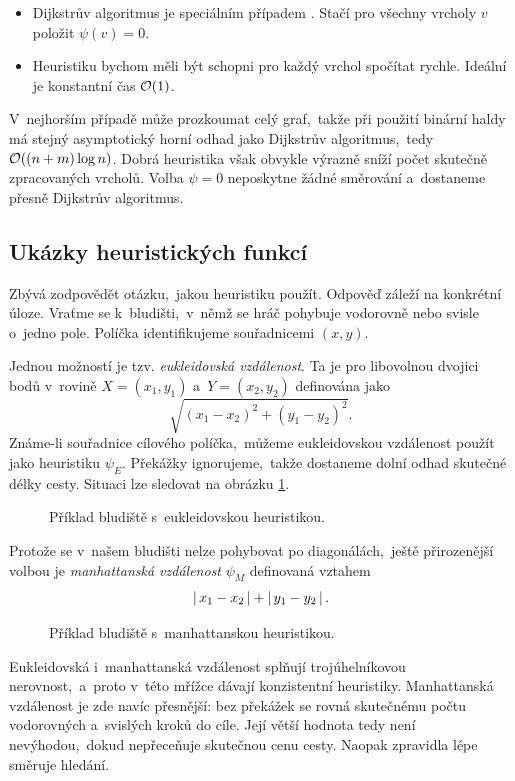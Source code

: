 
\begin{remark}
    \begin{itemize}
        \item Dijkstrův algoritmus je speciálním případem \Astar. Stačí pro všechny vrcholy $v$ položit $\psi(v)=0$.
        \item Heuristiku bychom měli být schopni pro každý vrchol spočítat rychle. Ideální je konstantní čas $\mathcal{O}(1)$.
    \end{itemize}
\end{remark}

V~nejhorším případě může \Astar{} prozkoumat celý graf,~takže při použití binární haldy má stejný asymptotický horní odhad jako Dijkstrův algoritmus,~tedy $\mathcal{O}((n+m)\log n)$. Dobrá heuristika však obvykle výrazně sníží počet skutečně zpracovaných vrcholů. Volba $\psi=0$ neposkytne žádné směrování a~dostaneme přesně Dijkstrův algoritmus.

\subsection{Ukázky heuristických funkcí}

Zbývá zodpovědět otázku,~jakou heuristiku použít. Odpověď záleží na konkrétní úloze. Vraťme se k~bludišti,~v~němž se hráč pohybuje vodorovně nebo svisle o~jedno pole. Políčka identifikujeme souřadnicemi $(x,y)$.

Jednou možností je tzv. \emph{eukleidovská vzdálenost}. Ta je pro libovolnou dvojici bodů v~rovině $X=(x_1,y_1)$ a~$Y=(x_2,y_2)$ definována jako
\[\sqrt{(x_1-x_2)^2+(y_1-y_2)^2}.\]
Známe-li souřadnice cílového políčka,~můžeme eukleidovskou vzdálenost použít jako heuristiku $\psi_E$. Překážky ignorujeme,~takže dostaneme dolní odhad skutečné délky cesty. Situaci lze sledovat na obrázku \ref{fig:astar_bludiste_euclid}.
\begin{figure}[ht]
    \centering
    
    \caption{Příklad bludiště s~eukleidovskou heuristikou.}
    \label{fig:astar_bludiste_euclid}
\end{figure}
Protože se v~našem bludišti nelze pohybovat po diagonálách,~ještě přirozenější volbou je \emph{manhattanská vzdálenost} $\psi_M$ definovaná vztahem
\[\left|\,x_1-x_2\,\right|+\left|\,y_1-y_2\,\right|.\]
\begin{figure}[ht]
    \centering
    
    \caption{Příklad bludiště s~manhattanskou heuristikou.}
    \label{fig:astar_bludiste_manhattan}
\end{figure}
Eukleidovská i~manhattanská vzdálenost splňují trojúhelníkovou nerovnost,~a~proto v~této mřížce dávají konzistentní heuristiky. Manhattanská vzdálenost je zde navíc přesnější: bez překážek se rovná skutečnému počtu vodorovných a~svislých kroků do cíle. Její větší hodnota tedy není nevýhodou,~dokud nepřeceňuje skutečnou cenu cesty. Naopak zpravidla lépe směruje hledání.
